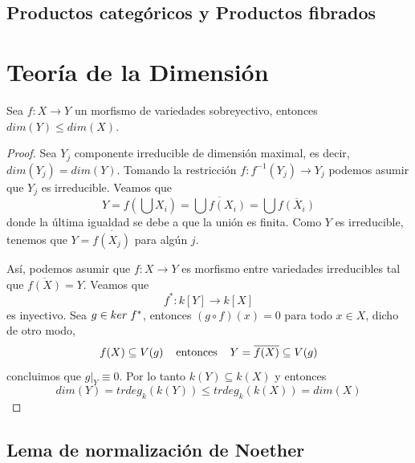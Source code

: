 \documentclass[11pt]{article}
\begin{document}

\newpage

\subsection{Productos categóricos y Productos fibrados} %

\newpage

\section{Teoría de la Dimensión} %

\begin{lema}
    Sea $f:X\to Y$ un morfismo de variedades sobreyectivo, entonces $dim(Y)\leq dim(X)$.
\end{lema}

\begin{proof}
    Sea $Y_{j}$ componente irreducible de dimensión maximal, es decir, $dim(Y_{j})=dim(Y)$. 
    Tomando la restricción $f:f^{-1}(Y_{j})\to Y_{j}$ podemos asumir que $Y_{j}$ es irreducible.
    Veamos que
    \begin{equation*}
        Y=f\left(\bigcup X_{i}\right)=\overline{\bigcup f(X_{i})}=\bigcup\overline{f(X_{i})}
    \end{equation*}
    donde la última igualdad se debe a que la unión es finita. Como $Y$ es irreducible, tenemos 
    que $Y=\overline{f(X_{j})}$ para algún $j$. 
    
    Así, podemos asumir que $f:X\to Y$ es morfismo entre variedades irreducibles tal que 
    $\overline{f(X)}=Y$. Veamos que
    \begin{equation*}
        f^{*}:k[Y]\to k[X]
    \end{equation*}
    es inyectivo. Sea $g\in ker\hspace{1mm}f^{*}$, entonces $(g\circ f)(x)=0$ para todo $x\in X$, dicho de 
    otro modo,
    \begin{equation*}
        f(X)\subseteq V(g) \hspace{4mm}\text{entonces}\hspace{4mm} Y=\overline{f(X)}\subseteq V(g)
    \end{equation*}
    concluimos que $g|_{Y}\equiv0$. Por lo tanto $k(Y)\subseteq k(X)$ y entonces
    \begin{equation*}
        dim(Y)=trdeg_{k}(k(Y))\leq trdeg_{k}(k(X))=dim(X)
    \end{equation*}
\end{proof}

\newpage

\subsection{Lema de normalización de Noether}

\end{document}
